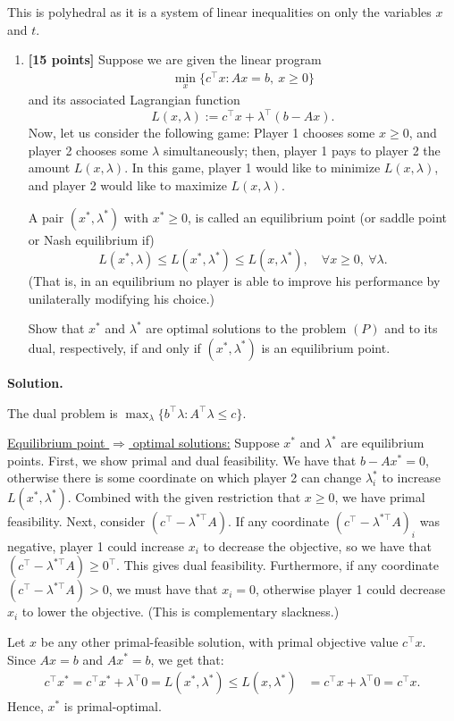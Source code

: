 \documentclass[11pt,letterpaper]{article}
\theoremstyle{definition}
\newcommand{\solution}{\medskip\noindent\textbf{Solution.}\par\medskip}
\begin{document}
This is polyhedral as it is a system of linear inequalities on only the variables $x$ and $t$.

\begin{enumerate}[resume=q]
\item \textbf{[15 points]} Suppose we are given the linear program
\begin{align*}
    \min_x \{c^\top x : Ax = b, \ x \geq 0\} \tag{$P$}
\end{align*}
and its associated Lagrangian function
\[
L(x, \lambda) := c^\top x + \lambda^\top (b - Ax).
\]
Now, let us consider the following game: Player 1 chooses some $x \geq 0$, and player 2 chooses some $\lambda$ simultaneously; then, player 1 pays to player 2 the amount $L(x, \lambda)$. In this game, player 1 would like to minimize $L(x, \lambda)$, and player 2 would like to maximize $L(x, \lambda)$.

A pair $(x^*, \lambda^*)$ with $x^* \geq 0$, is called an equilibrium point (or saddle point or Nash equilibrium if)
\[
L(x^*, \lambda) \leq L(x^*, \lambda^*) \leq L(x, \lambda^*), \quad \forall x \geq 0, \ \forall \lambda.
\]
(That is, in an equilibrium no player is able to improve his performance by unilaterally modifying his choice.)

Show that $x^*$ and $\lambda^*$ are optimal solutions to the problem $(P)$ and to its dual, respectively, if and only if $(x^*, \lambda^*)$ is an equilibrium point.
\end{enumerate}

\solution

The dual problem is $\max_{\lambda}\{b^\top \lambda : A^\top \lambda \leq c \}$.

\ul{Equilibrium point $\Rightarrow$ optimal solutions:}
Suppose $x^*$ and $\lambda^*$ are equilibrium points. First, we show primal and dual feasibility.
We have that $b-Ax^*=0$, otherwise there is some coordinate on which player 2 can change $\lambda^*_i$ to increase $L(x^*,\lambda^*)$.
Combined with the given restriction that $x\geq 0$, we have primal feasibility.
Next, consider $(c^\top - \lambda^{*\top} A)$.
If any coordinate $(c^\top - \lambda^{*\top} A)_i$ was negative, player 1 could increase $x_i$ to decrease the objective, so we have that $(c^\top - \lambda^{*\top} A)\geq 0^\top$. 
This gives dual feasibility.
Furthermore, if any coordinate $(c^\top - \lambda^{*\top} A)>0$, we must have that $x_i=0$, otherwise player 1 could decrease $x_i$ to lower the objective. 
(This is complementary slackness.)

Let $x$ be any other primal-feasible solution, with primal objective value $c^\top x$.
Since $Ax=b$ and $Ax^*=b$, we get that:
\begin{align*}
    c^\top x^* = c^\top x^* + \lambda^\top 0 = L(x^*,\lambda^*) \le L(x,\lambda^*) &= c^\top x + \lambda^\top 0 = c^\top x.
\end{align*}
Hence, $x^*$ is primal-optimal.
\end{document}

